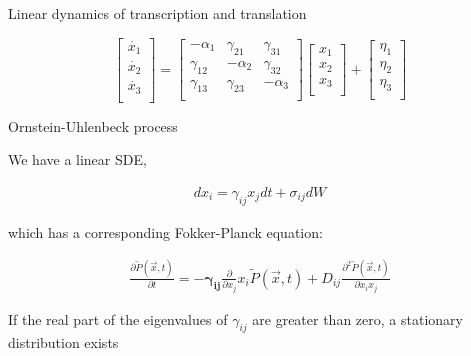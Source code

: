 \documentclass[aspectratio=1610]{beamer}					%
\begin{document}
\begin{frame}{Linear dynamics of transcription and translation}
\begin{textblock*}{15cm}
\begin{equation*}
\begin{bmatrix} 
    \dot{x_{1}}\\
	\dot{x_{2}}\\
	\dot{x_{3}}\\
    \end{bmatrix}
    =
\begin{bmatrix} 
    -\alpha_{1} & \gamma_{21} & \gamma_{31} \\
	\gamma_{12} & -\alpha_{2} & \gamma_{32}\\
	\gamma_{13} & \gamma_{23} & -\alpha_{3} \\
\end{bmatrix}
\begin{bmatrix} 
    x_{1}\\
	x_{2}\\
	x_{3}\\
    \end{bmatrix}
+ 
\begin{bmatrix} 
    \eta_{1}\\
	\eta_{2}\\
	\eta_{3}\\
    \end{bmatrix}
\end{equation*}

\end{textblock*}

\end{frame}

\begin{frame}{Ornstein-Uhlenbeck process}

We have a linear SDE, 

\begin{align*}
dx_{i} = \gamma_{ij}x_{j}dt + \sigma_{ij}dW
\end{align*}

which has a corresponding Fokker-Planck equation:

\begin{align}
\frac{\partial \tilde{P}(\vec{x},t)}{\partial t}= -\bm{\gamma_{ij}}\frac{\partial}{\partial x_{j}} x_{i}\tilde{P}(\vec{x},t) + D_{ij}\frac{\partial^{2} \tilde{P}(\vec{x},t)}{\partial x_{i}x_{j}}
\end{align}

If the real part of the eigenvalues of $\gamma_{ij}$ are greater than zero, a stationary distribution exists

\end{frame}
\end{document}
